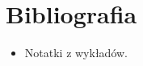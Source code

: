 \documentclass[a4paper, 11pt]{article}
\begin{document}
	
	
	
	
	\section{Bibliografia}
	\begin{itemize}
	\item Notatki z wykładów.
	\end{itemize}
	
\end{document}
